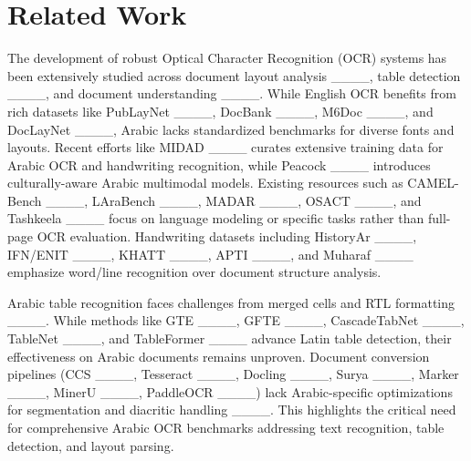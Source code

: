 \section{Related Work}
The development of robust Optical Character Recognition (OCR) systems has been extensively studied across document layout analysis ____, table detection ____, and document understanding ____. While English OCR benefits from rich datasets like PubLayNet ____, DocBank ____, M6Doc ____, and DocLayNet ____, Arabic lacks standardized benchmarks for diverse fonts and layouts. Recent efforts like MIDAD ____ curates extensive training data for Arabic OCR and handwriting recognition, while Peacock ____ introduces culturally-aware Arabic multimodal models. Existing resources such as CAMEL-Bench ____, LAraBench ____, MADAR ____, OSACT ____, and Tashkeela ____ focus on language modeling or specific tasks rather than full-page OCR evaluation. Handwriting datasets including HistoryAr ____, IFN/ENIT ____, KHATT ____, APTI ____, and Muharaf ____ emphasize word/line recognition over document structure analysis.



\noindent Arabic table recognition faces challenges from merged cells and RTL formatting ____. While methods like GTE ____, GFTE ____, CascadeTabNet ____, TableNet ____, and TableFormer ____ advance Latin table detection, their effectiveness on Arabic documents remains unproven. Document conversion pipelines (CCS ____, Tesseract ____, Docling ____, Surya ____, Marker ____, MinerU ____, PaddleOCR ____) lack Arabic-specific optimizations for segmentation and diacritic handling ____. This highlights the critical need for comprehensive Arabic OCR benchmarks addressing text recognition, table detection, and layout parsing.